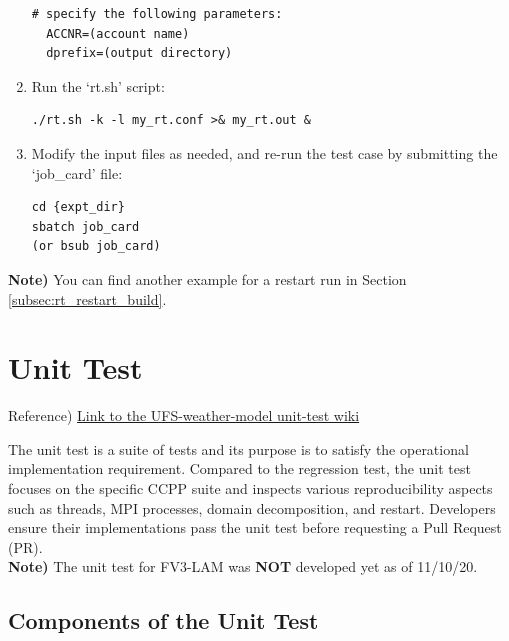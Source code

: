\documentclass[11pt,fleqn]{report}              %
\begin{document}
\begin{enumerate}
\begin{lstlisting}[frame=trBL]
# specify the following parameters:
  ACCNR=(account name)
  dprefix=(output directory)
\end{lstlisting}

\item Run the `rt.sh' script:
\lstset{language=bash}   
\begin{lstlisting}[frame=trBL]
./rt.sh -k -l my_rt.conf >& my_rt.out &
\end{lstlisting}

\item Modify the input files as needed, and re-run the test case by submitting the `job\_card' file:
\lstset{language=bash}   
\begin{lstlisting}[frame=trBL]
cd {expt_dir}
sbatch job_card
(or bsub job_card)
\end{lstlisting}

\end{enumerate}

{\bf Note)} You can find another example for a restart run in Section \ref{subsec:rt_restart_build}.



\section{Unit Test}
\label{sec:dev_utest}

Reference) \href{https://github.com/ufs-community/ufs-weather-model/wiki/Running-unit-tests-using-utest}{Link to the UFS-weather-model unit-test wiki}

\vspace{0.3cm}

The unit test is a suite of tests and its purpose is to satisfy the operational implementation requirement. Compared to the regression test, the unit test focuses on the specific CCPP suite and inspects various reproducibility aspects such as threads, MPI processes, domain decomposition, and restart.  Developers ensure their implementations pass the unit test before requesting a Pull Request (PR). \\

{\bf Note)} The unit test for FV3-LAM was {\bf NOT} developed yet  as of 11/10/20. 

\subsection{Components of the Unit Test}
\end{document}
